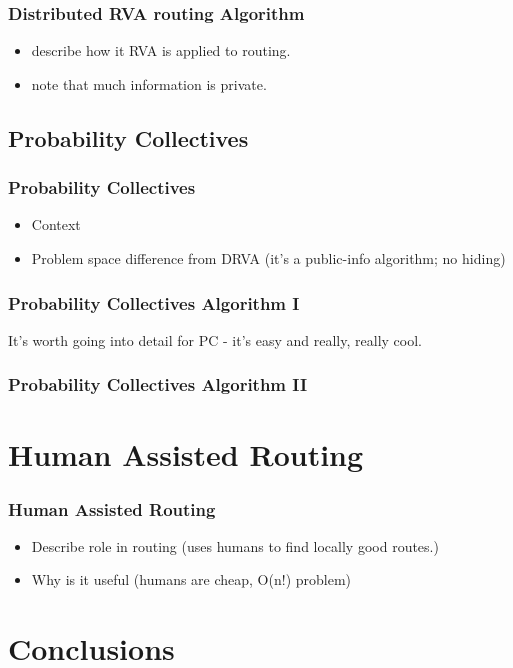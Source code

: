 \documentclass{beamer}
\begin{document}
\begin{frame}
\frametitle{Distributed RVA routing Algorithm}
	\begin{itemize}
		\item describe how it RVA is applied to routing. 
		\item note that much information is private.
	\end{itemize}

\end{frame}

\subsection{Probability Collectives}

\begin{frame}
\frametitle{Probability Collectives}
	\begin{itemize}
		\item Context
		\item Problem space difference from DRVA (it's a public-info algorithm; no hiding)		
	\end{itemize}
\end{frame}


\begin{frame}
\frametitle{Probability Collectives Algorithm I}
	It's worth going into detail for PC - it's easy and really, really cool.
\end{frame}

\begin{frame}
\frametitle{Probability Collectives Algorithm II}
\end{frame}

\section{Human Assisted Routing}

\begin{frame}
\frametitle{Human Assisted Routing}
	\begin{itemize}
		\item Describe role in routing (uses humans to find locally good routes.)
		\item Why is it useful (humans are cheap, O(n!) problem)
	\end{itemize}
\end{frame}

\section{Conclusions}
\end{document}
